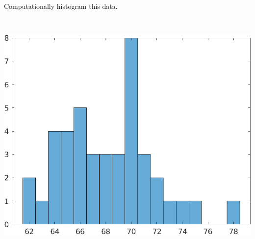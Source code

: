 Computationally histogram this data.

\begin{solution} \
    \begin{center}
        \includegraphics{img/e6p5a.png}
    \end{center}
\end{solution}